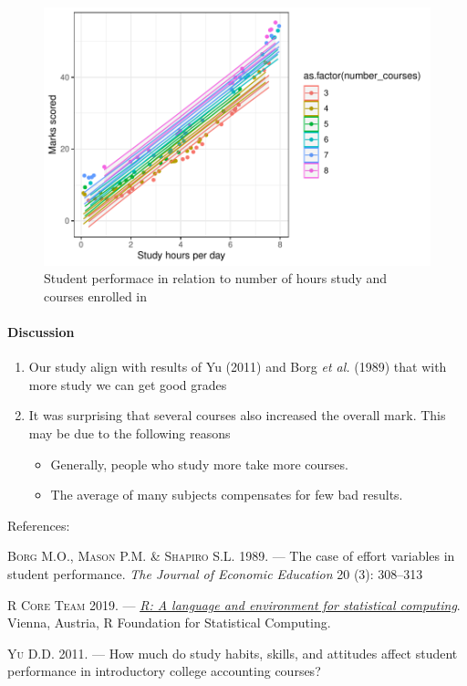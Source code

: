 \documentclass[
]{article}
\providecommand{\tightlist}{%
  \setlength{\itemsep}{0pt}\setlength{\parskip}{0pt}}
\newlength{\cslhangindent}
\newlength{\cslentryspacingunit} %
\newenvironment{CSLReferences}[2] %
 {%
  \setlength{\parindent}{0pt}
  \ifodd #1
  \let\oldpar\par
  \def\par{\hangindent=\cslhangindent\oldpar}
  \fi
  \setlength{\parskip}{#2\cslentryspacingunit}
 }%
 {}
\begin{document}
\begin{figure}
\centering
\includegraphics{Workshop_mark_down_files/figure-latex/graphs-1.pdf}
\caption{Student performace in relation to number of hours study and
courses enrolled in}
\end{figure}

\hypertarget{discussion}{%
\paragraph{Discussion}\label{discussion}}

\begin{enumerate}
\def\labelenumi{\arabic{enumi}.}
\tightlist
\item
  Our study align with results of Yu (2011) and Borg \emph{et al.}
  (1989) that with more study we can get good grades
\item
  It was surprising that several courses also increased the overall
  mark. This may be due to the following reasons

  \begin{itemize}
  \tightlist
  \item
    Generally, people who study more take more courses.
  \item
    The average of many subjects compensates for few bad results.
  \end{itemize}
\end{enumerate}

References:

\hypertarget{refs}{}
\begin{CSLReferences}{0}{0}
\leavevmode{}%
\textsc{Borg M.O.}, \textsc{Mason P.M.} \& \textsc{Shapiro S.L.} 1989.
--- The case of effort variables in student performance. \emph{The
Journal of Economic Education} 20 (3): 308--313

\leavevmode{}%
\textsc{R Core Team} 2019. --- \emph{\href{https://www.R-project.org}{R:
A language and environment for statistical computing}}. Vienna, Austria,
R Foundation for Statistical Computing.

\leavevmode{}%
\textsc{Yu D.D.} 2011. --- How much do study habits, skills, and
attitudes affect student performance in introductory college accounting
courses?

\end{CSLReferences}
\end{document}
